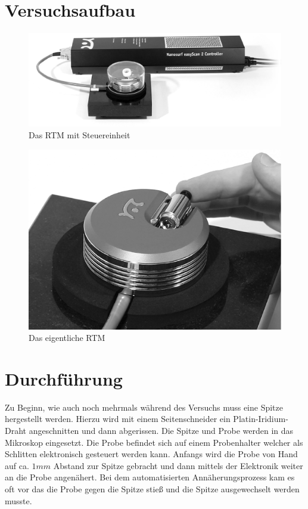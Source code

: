 \documentclass[12pt]{article}
\begin{document}
\section{Versuchsaufbau}
\begin{figure}[H]
\centering
\includegraphics[width=0.9\linewidth]{pictures/aufbau.eps}
\caption{Das RTM mit Steuereinheit}
\end{figure}

\begin{figure}[H]
\centering
\includegraphics[width=0.9\linewidth]{pictures/rastertunnel.eps}
\caption{Das eigentliche RTM}
\end{figure}
\section{Durchführung}
Zu Beginn, wie auch noch mehrmals während des Versuchs muss eine Spitze hergestellt werden. Hierzu wird mit einem Seitenschneider ein Platin-Iridium-Draht angeschnitten und dann abgerissen. Die Spitze und Probe werden in das Mikroskop eingesetzt. Die Probe befindet sich auf einem Probenhalter welcher als Schlitten elektronisch gesteuert werden kann. Anfangs wird die Probe von Hand auf ca. $1mm$ Abstand zur Spitze gebracht und dann mittels der Elektronik weiter an die Probe angenähert.
Bei dem automatisierten Annäherungsprozess kam es oft vor das die Probe gegen die Spitze stieß und die Spitze ausgewechselt werden musste. \\
\end{document}
